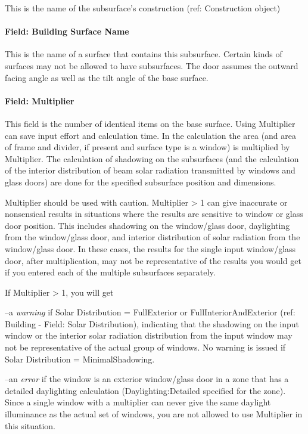 This is the name of the subsurface's construction (ref: Construction object)

\paragraph{Field: Building Surface Name}\label{field-building-surface-name-1}

This is the name of a surface that contains this subsurface. Certain kinds of surfaces may not be allowed to have subsurfaces. The door assumes the outward facing angle as well as the tilt angle of the base surface.

\paragraph{Field: Multiplier}\label{field-multiplier-2}

This field is the number of identical items on the base surface. Using Multiplier can save input effort and calculation time. In the calculation the area (and area of frame and divider, if present and surface type is a window) is multiplied by Multiplier. The calculation of shadowing on the subsurfaces (and the calculation of the interior distribution of beam solar radiation transmitted by windows and glass doors) are done for the specified subsurface position and dimensions.

Multiplier should be used with caution. Multiplier \textgreater{} 1 can give inaccurate or nonsensical results in situations where the results are sensitive to window or glass door position. This includes shadowing on the window/glass door, daylighting from the window/glass door, and interior distribution of solar radiation from the window/glass door. In these cases, the results for the single input window/glass door, after multiplication, may not be representative of the results you would get if you entered each of the multiple subsurfaces separately.

If Multiplier \textgreater{} 1, you will get

--a \emph{warning} if Solar Distribution = FullExterior or FullInteriorAndExterior (ref: Building - Field: Solar Distribution), indicating that the shadowing on the input window or the interior solar radiation distribution from the input window may not be representative of the actual group of windows. No warning is issued if Solar Distribution = MinimalShadowing.

--an \emph{error} if the window is an exterior window/glass door in a zone that has a detailed daylighting calculation (Daylighting:Detailed specified for the zone). Since a single window with a multiplier can never give the same daylight illuminance as the actual set of windows, you are not allowed to use Multiplier in this situation.


